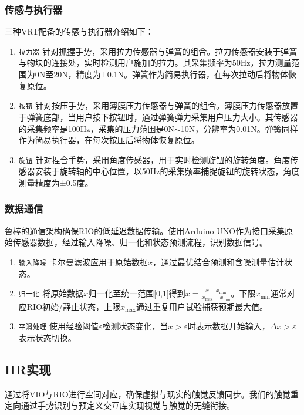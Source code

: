 \documentclass[runningheads]{llncs}
\begin{document}
\subsubsection{传感与执行器}
三种VRT配备的传感与执行器介绍如下：
\begin{enumerate}[label={\arabic*)}]
  \item \texttt{拉力器} 针对抓握手势，采用拉力传感器与弹簧的组合。拉力传感器安装于弹簧与物块的连接处，实时检测用户施加的拉力。其采集频率为50Hz，拉力测量范围为0N至20N，精度为±0.1N。弹簧作为简易执行器，在每次拉动后将物体恢复原位。
  \item \texttt{按钮} 针对按压手势，采用薄膜压力传感器与弹簧的组合。薄膜压力传感器放置于弹簧底部，当用户按下按钮时，通过弹簧弹力采集用户压力大小。其传感器的采集频率是100Hz，采集的压力范围是0N$\sim$10N，分辨率为0.01N。弹簧同样作为简易执行器，在每次按压后将物体恢复原位。
  \item \texttt{旋钮} 针对捏合手势，采用角度传感器，用于实时检测旋钮的旋转角度。角度传感器安装于旋转轴的中心位置，以50Hz的采集频率捕捉旋钮的旋转状态，角度测量精度为±0.5度。
\end{enumerate}

\subsubsection{数据通信}
鲁棒的通信架构确保RIO的低延迟数据传输。使用Arduino UNO作为接口采集原始传感器数据，经过输入降噪、归一化和状态预测流程，识别数据信号。
\begin{enumerate}[label={\arabic*)}]
  \item \texttt{输入降噪} 卡尔曼滤波应用于原始数据$x$，通过最优结合预测和含噪测量估计状态。
  \item \texttt{归一化} 将原始数据$x$归一化至统一范围[0,1]得到$\bar{x}=\displaystyle\frac{x-x_{\min}}{x_{\max}-x_{\min}}$。下限$x_{\min}$通常对应RIO初始/静止状态，上限$x_{\max}$通过重复用户试验捕获预期最大值。
  \item \texttt{平滑处理} 使用经验阈值$\varepsilon$检测状态变化，当$\bar{x}>\varepsilon$时表示数据开始输入，$\Delta\bar{x}>\varepsilon$表示状态切换。
\end{enumerate}

\subsection{HR实现}
通过将VIO与RIO进行空间对应，确保虚拟与现实的触觉反馈同步。我们的触觉重定向通过手势识别与预定义交互库实现视觉与触觉的无缝衔接。
\end{document}
